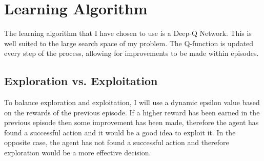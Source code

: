 \documentclass{article}
\begin{document}
\section{Learning Algorithm}
The learning algorithm that I have chosen to use is a Deep-Q Network. This is well suited to the large search space of my problem. The Q-function is updated every step of the process, allowing for improvements to be made within episodes.
\subsection{Exploration vs. Exploitation}
To balance exploration and exploitation, I will use a dynamic epsilon value based on the rewards of the previous episode. If a higher reward has been earned in the previous episode then some improvement has been made, therefore the agent has found a successful action and it would be a good idea to exploit it. In the opposite case, the agent has not found a successful action and therefore exploration would be a more effective decision.
\end{document}
